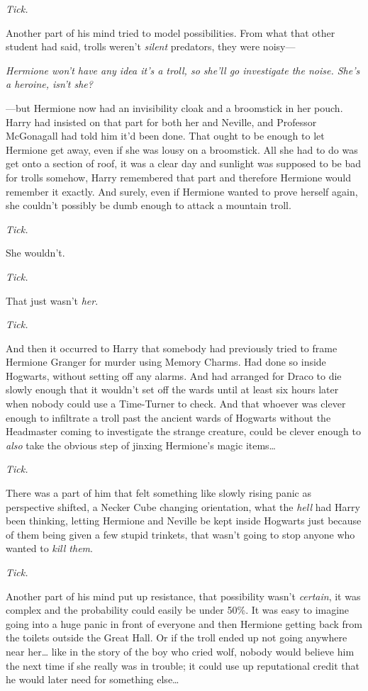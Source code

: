 \emph{Tick.}

Another part of his mind tried to model possibilities. From what that other student had said, trolls weren't \emph{silent} predators, they were noisy—

\emph{Hermione won't have any idea it's a troll, so she'll go investigate the noise. She's a heroine, isn't she?}

—but Hermione now had an invisibility cloak and a broomstick in her pouch. Harry had insisted on that part for both her and Neville, and Professor McGonagall had told him it'd been done. That ought to be enough to let Hermione get away, even if she was lousy on a broomstick. All she had to do was get onto a section of roof, it was a clear day and sunlight was supposed to be bad for trolls somehow, Harry remembered that part and therefore Hermione would remember it exactly. And surely, even if Hermione wanted to prove herself again, she couldn't possibly be dumb enough to attack a mountain troll.

\emph{Tick.}

She wouldn't.

\emph{Tick.}

That just wasn't \emph{her}.

\emph{Tick.}

And then it occurred to Harry that somebody had previously tried to frame Hermione Granger for murder using Memory Charms. Had done so inside Hogwarts, without setting off any alarms. And had arranged for Draco to die slowly enough that it wouldn't set off the wards until at least six hours later when nobody could use a Time-Turner to check. And that whoever was clever enough to infiltrate a troll past the ancient wards of Hogwarts without the Headmaster coming to investigate the strange creature, could be clever enough to \emph{also} take the obvious step of jinxing Hermione's magic items{\ldots}

\emph{Tick.}

There was a part of him that felt something like slowly rising panic as perspective shifted, a Necker Cube changing orientation, what the \emph{hell} had Harry been thinking, letting Hermione and Neville be kept inside Hogwarts just because of them being given a few stupid trinkets, that wasn't going to stop anyone who wanted to \emph{kill them}.

\emph{Tick.}

Another part of his mind put up resistance, that possibility wasn't \emph{certain}, it was complex and the probability could easily be under 50\%. It was easy to imagine going into a huge panic in front of everyone and then Hermione getting back from the toilets outside the Great Hall. Or if the troll ended up not going anywhere near her{\ldots} like in the story of the boy who cried wolf, nobody would believe him the next time if she really was in trouble; it could use up reputational credit that he would later need for something else{\ldots}

